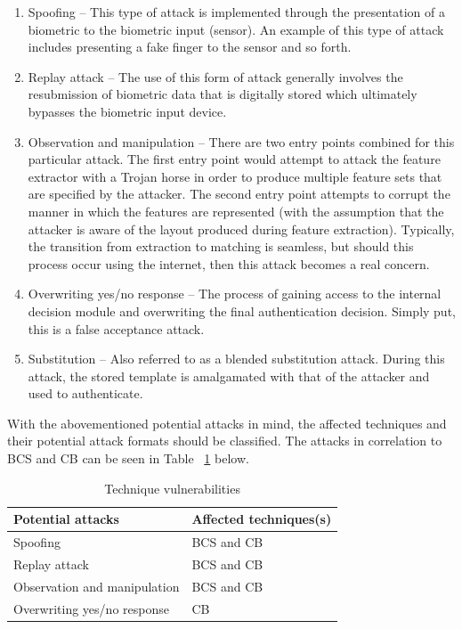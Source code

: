     \begin{enumerate}[label=\roman*.]
    
        \item Spoofing – This type of attack is implemented through the presentation of a   biometric to the biometric input (sensor). An example of this type of attack includes presenting a fake finger to the sensor and so forth.
        \item Replay attack – The use of this form of attack generally involves the resubmission of biometric data that is digitally stored which ultimately bypasses the biometric input device.
        \item Observation and manipulation – There are two entry points combined for this particular attack. The first entry point would attempt to attack the feature extractor with a Trojan horse in order to produce multiple feature sets that are specified by the attacker. The second entry point attempts to corrupt the manner in which the features are represented (with the assumption that the attacker is aware of the layout produced during feature extraction). Typically, the transition from extraction to matching is seamless, but should this process occur using the internet, then this attack becomes a real concern.
        \item Overwriting yes/no response – The process of gaining access to the internal decision module and overwriting the final authentication decision. Simply put, this is a false acceptance attack.
        \item Substitution – Also referred to as a blended substitution attack. During this attack, the stored template is amalgamated with that of the attacker and used to authenticate.

    \end{enumerate}
    
    With the abovementioned potential attacks in mind, the affected techniques and their potential attack formats should be classified. The attacks in correlation to BCS and CB can be seen in Table ~\ref{table:Technique vulnerabilities} below.
    
    
    \begin{table}[h!]
    \caption{Technique vulnerabilities}
    \centering
     \begin{tabular}{|p{} | p{}|} 
     \hline
    	\textbf{Potential attacks} & \textbf{Affected techniques(s)} \\ [1ex] 
     \hline\hline 
     Spoofing & BCS and CB  \\[1ex]
     \hline 
     Replay attack & BCS and CB \\[1ex]
     \hline
     Observation and manipulation & BCS and CB\\[1ex]
     \hline           
     Overwriting yes/no response & CB\\[1ex]
     \hline
     \end{tabular}
     \label{table:Technique vulnerabilities}
    \end{table}
    
